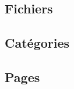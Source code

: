 \subsection{Fichiers}
	
	\newpage
\subsection{Catégories}
	
	\newpage
\subsection{Pages}
	
	\newpage
	